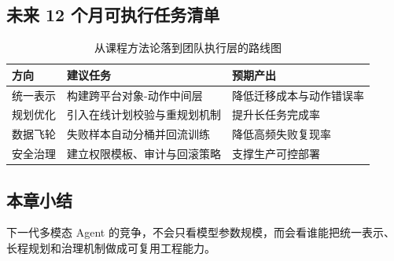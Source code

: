 \subsection{未来 12 个月可执行任务清单}
\begin{table}[H]
\centering
\begin{tabular}{p{2.8cm}p{4.8cm}p{3.6cm}}
\toprule
\textbf{方向} & \textbf{建议任务} & \textbf{预期产出} \\
\midrule
统一表示 & 构建跨平台对象-动作中间层 & 降低迁移成本与动作错误率 \\
规划优化 & 引入在线计划校验与重规划机制 & 提升长任务完成率 \\
数据飞轮 & 失败样本自动分桶并回流训练 & 降低高频失败复现率 \\
安全治理 & 建立权限模板、审计与回滚策略 & 支撑生产可控部署 \\
\bottomrule
\end{tabular}
\caption{从课程方法论落到团队执行层的路线图}
\end{table}

\subsection{本章小结}
下一代多模态 Agent 的竞争，不会只看模型参数规模，而会看谁能把统一表示、长程规划和治理机制做成可复用工程能力。

